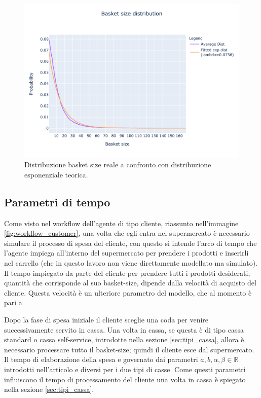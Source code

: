 \begin{figure}[H]
	\centering
	\includegraphics[width=14cm]{"images/basket_size_fitted.png"}
	\caption{Distribuzione basket size reale a confronto con distribuzione esponenziale teorica.}
	\label{fig:dist_basket_size}
\end{figure}

\subsection{Parametri di tempo}
Come visto nel workflow dell'agente di tipo cliente, riassunto nell'immagine \ref{fig:workflow_customer}, una volta che egli entra nel supermercato è necessario simulare il processo di spesa del cliente, con questo si intende l'arco di tempo che l'agente impiega all'interno del supermercato per prendere i prodotti e inserirli nel carrello (che in questo lavoro non viene direttamente modellato ma simulato). Il tempo impiegato da parte del cliente per prendere tutti i prodotti desiderati, quantità che corrisponde al suo basket-size, dipende dalla velocità di acquisto del cliente. Questa velocità è un ulteriore parametro del modello, che al momento è pari a 

Dopo la fase di spesa iniziale il cliente sceglie una coda per venire successivamente servito in cassa. Una volta in cassa, se questa è di tipo cassa standard o cassa self-service, introdotte nella sezione \ref{sec:tipi_cassa}, allora è necessario processare tutto il basket-size; quindi il cliente esce dal supermercato. Il tempo di elaborazione della spesa e governato dai parametri $a,b,\alpha ,\beta \in \mathbb{R}$  introdotti nell'articolo \cite{article1} e diversi per i due tipi di casse. Come questi parametri influiscono il tempo di processamento del cliente una volta in cassa è spiegato nella sezione \ref{sec:tipi_cassa}.

